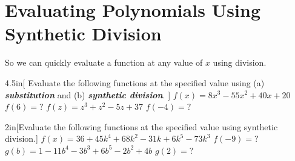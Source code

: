 \section{Evaluating Polynomials Using Synthetic Division}

So we can quickly evaluate a function at any value of $x$ using  division.

\begin{my2Problems}{4.5in}[%
    Evaluate the following functions at the specified value using
    (a) {\bfseries\itshape substitution} and (b) {\bfseries\itshape synthetic division}.
    ]
    {
        $ f(x) = 8x^3 -55x^2 + 40x +20 $
        \quad
        $f(6) = \text{?}$
    }
    {
        $ f(z) = z^3 + z^2 - 5z + 37 $
        \quad
        $f(-4) = \text{?}$
    }
\end{my2Problems}

\begin{my2Problems}{2in}[Evaluate the following functions at the specified value using synthetic division.]
    {
        $ f(x) = 36 + 45k^4 + 68k^2 -31k + 6k^5 - 73k^3 $
        \quad
        $f(-9) = \text{?}$
    }
    {
        $ g(b) = 1 - 11b^4 - 3b^3 + 6b^5 -2b^2 + 4b $
        \quad
        $g(2) = \text{?}$
    }
\end{my2Problems}
